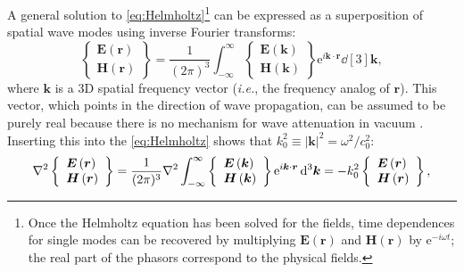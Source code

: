 A general solution to \cref{eq:Helmholtz}\footnote{Once the Helmholtz equation has been solved for the fields, time dependences for single modes can be recovered by multiplying $\mathbold{E} \left( \mathbold{r} \right)$ and $\mathbold{H} \left( \mathbold{r} \right)$ by $\mathrm{e}^{-i \omega t}$; the real part of the phasors correspond to the physical fields.} can be expressed as a superposition of spatial wave modes using inverse Fourier transforms: %
\begin{equation} \label{eq:fourier_fields}
 \left\{
  \begin{array}{lr}
  \mathbold{E} \left( \mathbold{r} \right) \\
  \mathbold{H} \left( \mathbold{r} \right)
  \end{array}
 \right\} = \frac{1}{(2 \pi)^3} \int_{-\mathbold{\infty}}^{\mathbold{\infty}} \left\{
  \begin{array}{lr}
  \mathbold{E} \left( \mathbold{k} \right) \\
  \mathbold{H} \left( \mathbold{k} \right)
  \end{array}
 \right\} \mathrm{e}^{i \mathbold{k} \cdot \mathbold{r}} \dd[3]{\mathbold{k}},
 \end{equation}
where $\mathbold{k}$ is a 3D spatial frequency vector (\emph{i.e.}, the frequency analog of $\mathbold{r}$). 
This vector, which points in the direction of wave propagation, can be assumed to be purely real because there is no mechanism for wave attenuation in vacuum \cite{Landau60,Jackson75,Griffiths17,Born80}. 
Inserting this into the \cref{eq:Helmholtz} shows that $k_0^2 \equiv | \mathbold{k} |^2 = \omega^2 / c_0^2$: 
\begin{equation}
 \laplacian \left\{
  \begin{array}{lr}
  \mathbold{E} \left( \mathbold{r} \right) \\
  \mathbold{H} \left( \mathbold{r} \right)
  \end{array}
 \right\} = \frac{1}{(2 \pi)^3} \laplacian \int_{-\mathbold{\infty}}^{\mathbold{\infty}} \left\{
  \begin{array}{lr}
  \mathbold{E} \left( \mathbold{k} \right) \\
  \mathbold{H} \left( \mathbold{k} \right)
  \end{array}
 \right\} \mathrm{e}^{i \mathbold{k} \cdot \mathbold{r}} \dd[3]{\mathbold{k}}
  = - k_0^2 \left\{
  \begin{array}{lr}
  \mathbold{E} \left( \mathbold{r} \right) \\
  \mathbold{H} \left( \mathbold{r} \right)
  \end{array}
 \right\} ,
 \end{equation}

